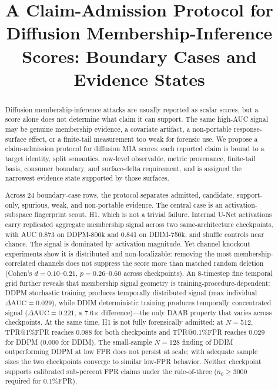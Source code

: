 \documentclass[10pt,conference]{IEEEtran}
\title{A Claim-Admission Protocol for Diffusion Membership-Inference Scores: Boundary Cases and Evidence States}
\author{\IEEEauthorblockN{Anonymous Authors}}
\begin{document}
\maketitle

\begin{abstract}
Diffusion membership-inference attacks are usually reported as scalar scores,
but a score alone does not determine what claim it can support. The same
high-AUC signal may be genuine membership evidence, a covariate artifact, a
non-portable response-surface effect, or a finite-tail measurement too weak
for forensic use. We propose a claim-admission protocol for diffusion MIA
scores: each reported claim is bound to a target identity, split semantics,
row-level observable, metric provenance, finite-tail basis, consumer boundary,
and surface-delta requirement, and is assigned the narrowest evidence state
supported by those surfaces.

Across 24 boundary-case rows, the protocol separates admitted, candidate,
support-only, spurious, weak, and non-portable evidence. The central case
is an activation-subspace fingerprint scout, H1, which is not a trivial
failure. Internal U-Net activations carry replicated aggregate membership
signal across two same-architecture checkpoints, with AUC 0.873 on DDPM-800k
and 0.841 on DDIM-750k, and shuffle controls near chance. The signal is
dominated by activation magnitude. Yet channel knockout experiments show it
is distributed and non-localizable: removing the most membership-correlated
channels does not suppress the score more than matched random deletion (Cohen's
$d{=}0.10$--$0.21$, $p{=}0.26$--$0.60$ across checkpoints). An 8-timestep
fine temporal grid further reveals that membership signal geometry is
training-procedure-dependent: DDPM stochastic training produces temporally
distributed signal (max individual $\Delta\text{AUC}{=}0.029$), while DDIM
deterministic training produces temporally concentrated signal
($\Delta\text{AUC}{=}0.221$, a 7.6$\times$ difference)---the only DAAB
property that varies across checkpoints. At the same time, H1 is not fully forensically admitted: at $N{=}512$, TPR@1\%FPR reaches 0.088 for both checkpoints and TPR@0.1\%FPR reaches 0.029 for DDPM (0.000 for DDIM). The small-sample $N{=}128$ finding of DDIM outperforming DDPM at low FPR does not persist at scale; with adequate sample sizes the two checkpoints converge to similar low-FPR behavior. Neither checkpoint supports calibrated sub-percent FPR claims under the rule-of-three ($n_0{\geq}3000$ required for 0.1\%FPR).


\end{abstract}
\end{document}
